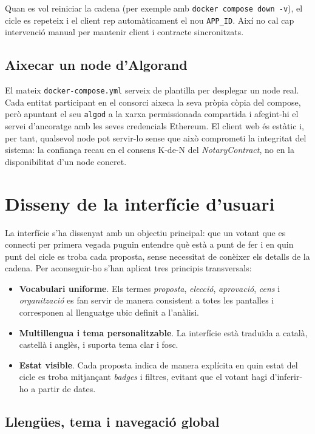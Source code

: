 Quan es vol reiniciar la cadena (per exemple amb \texttt{docker compose down -v}), el cicle es repeteix i el client rep automàticament el nou \texttt{APP\_ID}. Així no cal cap intervenció manual per mantenir client i contracte sincronitzats.

\subsection{Aixecar un node d'Algorand}

El mateix \texttt{docker-compose.yml} serveix de plantilla per desplegar un node real. Cada entitat participant en el consorci aixeca la seva pròpia còpia del compose, però apuntant el seu \texttt{algod} a la xarxa permissionada compartida i afegint-hi el servei d'ancoratge amb les seves credencials Ethereum. El client web és estàtic i, per tant, qualsevol node pot servir-lo sense que això comprometi la integritat del sistema: la confiança recau en el consens K-de-N del \textit{NotaryContract}, no en la disponibilitat d'un node concret.


\section{Disseny de la interfície d'usuari}

La interfície s'ha dissenyat amb un objectiu principal: que un votant que es connecti per primera vegada puguin entendre què està a punt de fer i en quin punt del cicle es troba cada proposta, sense necessitat de conèixer els detalls de la cadena. Per aconseguir-ho s'han aplicat tres principis transversals:

\begin{itemize}
    \item \textbf{Vocabulari uniforme}. Els termes \textit{proposta}, \textit{elecció}, \textit{aprovació}, \textit{cens} i \textit{organització} es fan servir de manera consistent a totes les pantalles i corresponen al llenguatge ubic definit a l'anàlisi.
    \item \textbf{Multillengua i tema personalitzable}. La interfície està traduïda a català, castellà i anglès, i suporta tema clar i fosc.
    \item \textbf{Estat visible}. Cada proposta indica de manera explícita en quin estat del cicle es troba mitjançant \textit{badges} i filtres, evitant que el votant hagi d'inferir-ho a partir de dates.
\end{itemize}

\subsection{Llengües, tema i navegació global}

